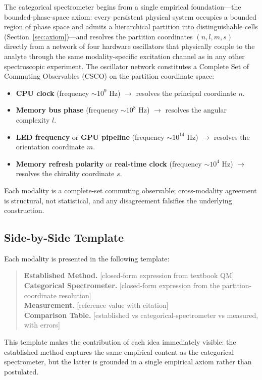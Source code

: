 \documentclass[11pt,a4paper]{article}
\theoremstyle{stmtstyle}
\theoremstyle{definition}
\theoremstyle{remark}
\begin{document}
The categorical spectrometer begins from a single empirical foundation---the bounded-phase-space axiom: every persistent physical system occupies a bounded region of phase space and admits a hierarchical partition into distinguishable cells (Section~\ref{sec:axiom})---and resolves the partition coordinates $(n,l,m,s)$ directly from a network of four hardware oscillators that physically couple to the analyte through the same modality-specific excitation channel as in any other spectroscopic experiment. The oscillator network constitutes a Complete Set of Commuting Observables (CSCO) on the partition coordinate space:
\begin{itemize}[nosep]
\item \textbf{CPU clock} (frequency $\sim 10^{9}$ Hz) $\to$ resolves the principal coordinate $n$.
\item \textbf{Memory bus phase} (frequency $\sim 10^{8}$ Hz) $\to$ resolves the angular complexity $l$.
\item \textbf{LED frequency} or \textbf{GPU pipeline} (frequency $\sim 10^{14}$ Hz) $\to$ resolves the orientation coordinate $m$.
\item \textbf{Memory refresh polarity} or \textbf{real-time clock} (frequency $\sim 10^{4}$ Hz) $\to$ resolves the chirality coordinate $s$.
\end{itemize}
Each modality is a complete-set commuting observable; cross-modality agreement is structural, not statistical, and any disagreement falsifies the underlying construction.

\subsection{Side-by-Side Template}

Each modality is presented in the following template:

\begin{quote}\small
\textbf{Established Method.} [closed-form expression from textbook QM]\\
\textbf{Categorical Spectrometer.} [closed-form expression from the partition-coordinate resolution]\\
\textbf{Measurement.} [reference value with citation]\\
\textbf{Comparison Table.} [established vs categorical-spectrometer vs measured, with errors]
\end{quote}

This template makes the contribution of each idea immediately visible: the established method captures the same empirical content as the categorical spectrometer, but the latter is grounded in a single empirical axiom rather than postulated.
\end{document}
